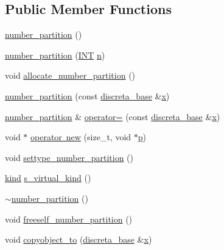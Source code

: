 \subsection*{Public Member Functions}
\begin{DoxyCompactItemize}
\item 
\mbox{\hyperlink{classnumber__partition_a3caf56544328aedc42115b7b89056106}{number\+\_\+partition}} ()
\item 
\mbox{\hyperlink{classnumber__partition_a5c08f2f2afd49281b54e799bd5fc3faa}{number\+\_\+partition}} (\mbox{\hyperlink{galois_8h_a09fddde158a3a20bd2dcadb609de11dc}{I\+NT}} \mbox{\hyperlink{simeon_8_c_a7f2cd26777ce0ff3fdaf8d02aacbddfb}{n}})
\item 
void \mbox{\hyperlink{classnumber__partition_a3c5649dc95f5ca53df4b0c58de6c1dc5}{allocate\+\_\+number\+\_\+partition}} ()
\item 
\mbox{\hyperlink{classnumber__partition_acb4eb29895a1b9594ff36c792af1ab11}{number\+\_\+partition}} (const \mbox{\hyperlink{classdiscreta__base}{discreta\+\_\+base}} \&\mbox{\hyperlink{alphabet2_8_c_a6150e0515f7202e2fb518f7206ed97dc}{x}})
\item 
\mbox{\hyperlink{classnumber__partition}{number\+\_\+partition}} \& \mbox{\hyperlink{classnumber__partition_a81b2d9c5c3f4b13e748c5a9bc01b54db}{operator=}} (const \mbox{\hyperlink{classdiscreta__base}{discreta\+\_\+base}} \&\mbox{\hyperlink{alphabet2_8_c_a6150e0515f7202e2fb518f7206ed97dc}{x}})
\item 
void $\ast$ \mbox{\hyperlink{classnumber__partition_ab36513c3a4dd1353edb3eb7e5b123bad}{operator new}} (size\+\_\+t, void $\ast$\mbox{\hyperlink{alphabet2_8_c_a533391314665d6bf1b5575e9a9cd8552}{p}})
\item 
void \mbox{\hyperlink{classnumber__partition_a3aaec1b557758f643ffc8555bbc358be}{settype\+\_\+number\+\_\+partition}} ()
\item 
\mbox{\hyperlink{discreta_8h_aaf25ee7e2306d78c74ec7bc48f092e81}{kind}} \mbox{\hyperlink{classnumber__partition_aaa88b590321ba25867fb1c70451c629a}{s\+\_\+virtual\+\_\+kind}} ()
\item 
\mbox{\hyperlink{classnumber__partition_af693fb3976d93ef732f6446702405bbc}{$\sim$number\+\_\+partition}} ()
\item 
void \mbox{\hyperlink{classnumber__partition_aa74111c1c8cd218b654e7b7c1ca42eb5}{freeself\+\_\+number\+\_\+partition}} ()
\item 
void \mbox{\hyperlink{classnumber__partition_acf25157ca8486f55d86d7ea05fa033be}{copyobject\+\_\+to}} (\mbox{\hyperlink{classdiscreta__base}{discreta\+\_\+base}} \&\mbox{\hyperlink{alphabet2_8_c_a6150e0515f7202e2fb518f7206ed97dc}{x}})

\end{DoxyCompactItemize}
